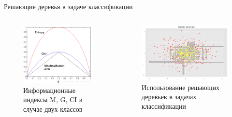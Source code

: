 \documentclass[notheorems, handout]{beamer}
\begin{document}
\begin{frame}{Решающие деревья в задаче классификации}
\begin{columns}
	\begin{column}{0.5\textwidth}
		\begin{figure}[h!]
		\includegraphics[width=\textwidth]{img/gini_entropy.png}
		\caption{Информационные индексы M, G, CI в случае двух классов}
		\end{figure}
	\end{column}
	\begin{column}{0.5\textwidth}
		\begin{figure}[h!]
		\includegraphics[width=\textwidth]{img/cltree2}
		\caption{Использование решающих деревьев в задачах классификации}
		\end{figure}
	\end{column}
\end{columns}
\end{frame}
\end{document}
